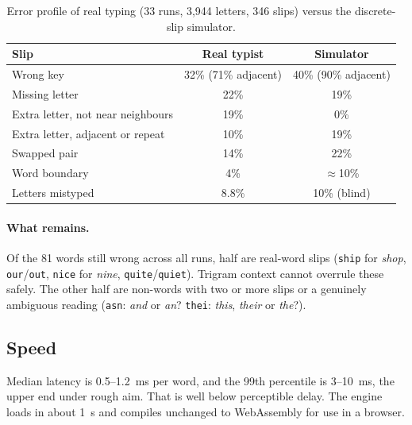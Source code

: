 \documentclass[11pt,a4paper]{article}
\newcommand{\ttw}[1]{\texttt{#1}}
\begin{document}
\begin{table}[t]
\centering\small
\caption{Error profile of real typing (33 runs, 3,944 letters, 346 slips) versus the discrete-slip simulator.}
\label{tab:profile}
\begin{tabular}{lcc}
\toprule
Slip & Real typist & Simulator \\
\midrule
Wrong key & 32\% (71\% adjacent) & 40\% (90\% adjacent) \\
Missing letter & 22\% & 19\% \\
Extra letter, not near neighbours & 19\% & 0\% \\
Extra letter, adjacent or repeat & 10\% & 19\% \\
Swapped pair & 14\% & 22\% \\
Word boundary & 4\% & $\approx$10\% \\
\midrule
Letters mistyped & 8.8\% & 10\% (blind) \\
\bottomrule
\end{tabular}
\end{table}

\paragraph{What remains.} Of the 81 words still wrong across all runs, half are real-word slips (\ttw{ship} for \emph{shop}, \ttw{our}/\ttw{out}, \ttw{nice} for \emph{nine}, \ttw{quite}/\ttw{quiet}). Trigram context cannot overrule these safely. The other half are non-words with two or more slips or a genuinely ambiguous reading (\ttw{asn}: \emph{and} or \emph{an}? \ttw{thei}: \emph{this}, \emph{their} or \emph{the}?).

\subsection{Speed}
Median latency is 0.5--1.2~ms per word, and the 99th percentile is 3--10~ms, the upper end under rough aim. That is well below perceptible delay. The engine loads in about 1~s and compiles unchanged to WebAssembly for use in a browser.
\end{document}
